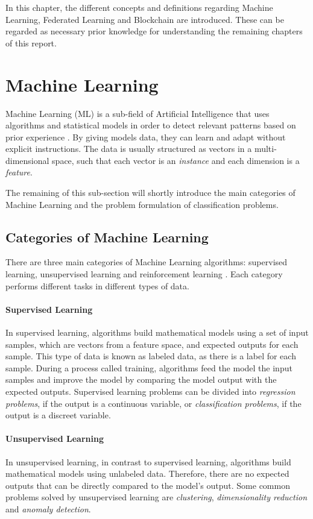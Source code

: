 In this chapter, the different concepts and definitions regarding Machine Learning, Federated Learning and Blockchain are introduced. These can be regarded as necessary prior knowledge for understanding the remaining chapters of this report.

\section{Machine Learning}

Machine Learning (ML) is a sub-field of Artificial Intelligence that uses algorithms and statistical models in order to detect relevant patterns based on prior experience \cite{geron_2019}. By giving models data, they can learn and adapt without explicit instructions. The data is usually structured as vectors in a multi-dimensional space, such that each vector is an \textit{instance} and each dimension is a \textit{feature}.

The remaining of this sub-section will shortly introduce the main categories of Machine Learning and the problem formulation of classification problems.

\subsection{Categories of Machine Learning}

There are three main categories of Machine Learning algorithms: supervised learning, unsupervised learning and reinforcement learning \cite{geron_2019}. Each category performs different tasks in different types of data.

\paragraph{Supervised Learning} In supervised learning, algorithms build mathematical models using a set of input samples, which are vectors from a feature space, and expected outputs for each sample. This type of data is known as labeled data, as there is a label for each sample. During a process called training, algorithms feed the model the input samples and improve the model by comparing the model output with the expected outputs. Supervised learning problems can be divided into \textit{regression problems}, if the output is a continuous variable, or \textit{classification problems}, if the output is a discreet variable.

\paragraph{Unsupervised Learning} In unsupervised learning, in contrast to supervised learning, algorithms build mathematical models using unlabeled data. Therefore, there are no expected outputs that can be directly compared to the model's output. Some common problems solved by unsupervised learning are \textit{clustering}, \textit{dimensionality reduction} and \textit{anomaly detection}.

